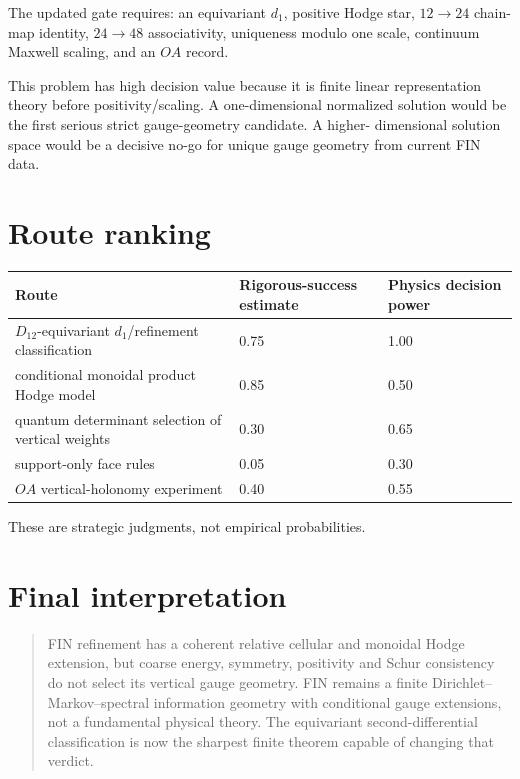\documentclass[11pt,a4paper]{article}
\begin{document}
The updated gate requires: an equivariant $d_1$, positive Hodge star,
$12\to24$ chain-map identity, $24\to48$ associativity, uniqueness modulo one
scale, continuum Maxwell scaling, and an $OA$ record.

This problem has high decision value because it is finite linear
representation theory before positivity/scaling.  A one-dimensional normalized
solution would be the first serious strict gauge-geometry candidate.  A higher-
dimensional solution space would be a decisive no-go for unique gauge geometry
from current FIN data.

\section{Route ranking}

\begin{longtable}{@{}p{}p{}p{}@{}}
\toprule
Route & Rigorous-success estimate & Physics decision power \\
\midrule\endhead
$D_{12}$-equivariant $d_1$/refinement classification & 0.75 & 1.00 \\
conditional monoidal product Hodge model & 0.85 & 0.50 \\
quantum determinant selection of vertical weights & 0.30 & 0.65 \\
support-only face rules & 0.05 & 0.30 \\
$OA$ vertical-holonomy experiment & 0.40 & 0.55 \\
\bottomrule
\end{longtable}

These are strategic judgments, not empirical probabilities.

\section{Final interpretation}

\begin{quote}
FIN refinement has a coherent relative cellular and monoidal Hodge extension,
but coarse energy, symmetry, positivity and Schur consistency do not select its
vertical gauge geometry.  FIN remains a finite Dirichlet--Markov--spectral
information geometry with conditional gauge extensions, not a fundamental
physical theory.  The equivariant second-differential classification is now
the sharpest finite theorem capable of changing that verdict.
\end{quote}

\appendix
\end{document}
